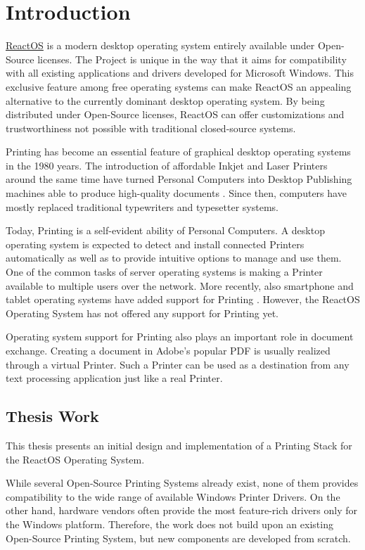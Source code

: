 \chapter{Introduction}
\href{https://reactos.org}{ReactOS} is a modern desktop operating system entirely available under Open-Source licenses.
The Project is unique in the way that it aims for compatibility with all existing applications and drivers developed for Microsoft Windows.
This exclusive feature among free operating systems can make ReactOS an appealing alternative to the currently dominant desktop operating system.
By being distributed under Open-Source licenses, ReactOS can offer customizations and trustworthiness not possible with traditional closed-source systems.

Printing has become an essential feature of graphical desktop operating systems in the 1980 years.
The introduction of affordable Inkjet and Laser Printers around the same time have turned Personal Computers into Desktop Publishing machines able to produce high-quality documents \cite{leurs2013postscript}.
Since then, computers have mostly replaced traditional typewriters and typesetter systems.

Today, Printing is a self-evident ability of Personal Computers.
A desktop operating system is expected to detect and install connected Printers automatically as well as to provide intuitive options to manage and use them.
One of the common tasks of server operating systems is making a Printer available to multiple users over the network.
More recently, also smartphone and tablet operating systems have added support for Printing \cite{aosp2015kitkat}.
However, the ReactOS Operating System has not offered any support for Printing yet.

Operating system support for Printing also plays an important role in document exchange.
Creating a document in Adobe's popular \gls{PDF} is usually realized through a virtual Printer.
Such a Printer can be used as a destination from any text processing application just like a real Printer.


\section{Thesis Work}
This thesis presents an initial design and implementation of a Printing Stack for the ReactOS Operating System.

While several Open-Source Printing Systems already exist, none of them provides compatibility to the wide range of available Windows Printer Drivers.
On the other hand, hardware vendors often provide the most feature-rich drivers only for the Windows platform.
Therefore, the work does not build upon an existing Open-Source Printing System, but new components are developed from scratch.

